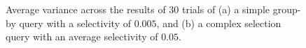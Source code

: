 \begin{figure}
\begin{center}
\caption{Average variance across the results of 30 trials of (a) a simple group-by query with a selectivity of $0.005$, and (b) a complex selection query with an average selectivity of $0.05$.}
\label{fig:variance}
\end{center}
\end{figure}

